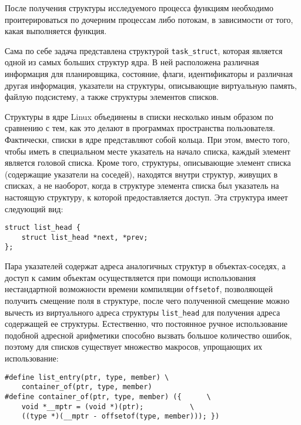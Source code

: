 После получения структуры исследуемого процесса функциям необходимо
проитерироваться по дочерним процессам либо потокам, в зависимости от того,
какая выполняется функция.

Сама по себе задача представлена структурой \texttt{task\_struct}, которая
является одной из самых больших структур ядра. В ней расположена различная
информация для планировщика, состояние, флаги, идентификаторы и различная другая
информация, указатели на структуры, описывающие виртуальную память, файлую
подсистему, а также структуры элементов списков.

Структуры в ядре Linux объединены в списки несколько иным образом по сравнению с
тем, как это делают в программах пространства пользователя. Фактически, списки в
ядре представляют собой кольца. При этом, вместо того, чтобы иметь в специальном
месте указатель на начало списка, каждый элемент является головой списка. Кроме
того, структуры, описывающие элемент списка (содержащие указатели на соседей),
находятся внутри структур, живущих в списках, а не наоборот, когда в структуре
элемента списка был указатель на настоящую структуру, к которой предоставляется
доступ. Эта структура имеет следующий вид:
\medskip
\begin{lstlisting}[style=cstyle]
struct list_head {
	struct list_head *next, *prev;
};
\end{lstlisting}
\medskip

Пара указателей содержат адреса аналогичных структур в объектах-соседях, а
доступ к самим объектам осуществляется при помощи использования нестандартной
возможности времени компиляции \texttt{offsetof}, позволяющей получить смещение
поля в структуре, после чего полученной смещение можно вычесть из виртуального
адреса структуры \texttt{list\_head} для получения адреса содержащей ее
структуры. Естественно, что постоянное ручное использование подобной адресной
арифметики способно вызвать большое количество ошибок, поэтому для списков
существует множество макросов, упрощающих их использование:
\medskip
\begin{lstlisting}[style=cstyle]
#define list_entry(ptr, type, member) \
	container_of(ptr, type, member)
#define container_of(ptr, type, member) ({		\
	void *__mptr = (void *)(ptr);			\
	((type *)(__mptr - offsetof(type, member))); })
\end{lstlisting}
\medskip

